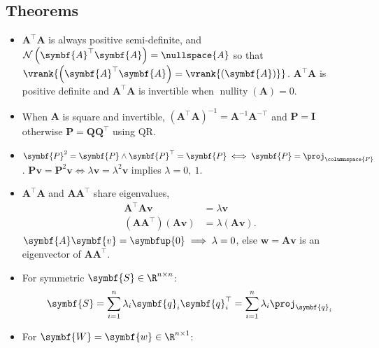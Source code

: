\documentclass{article}
\DeclareMathOperator*{\nullity}{nullity}
\begin{document}
\begin{multicols*}{3}
    \section{Theorems}
    \begin{itemize}
        \item \(\symbf{A}^\top \symbf{A}\) is always positive semi-definite,
              and \(\mathcal{N}\left( \symbf{A}^\top\symbf{A} \right) = \nullspace{A}\) so that
              \(\vrank{\left( \symbf{A}^\top \symbf{A} \right) = \vrank{\left( \symbf{A} \right)}}\).
              \(\symbf{A}^\top \symbf{A}\) is positive definite and
              \(\symbf{A}^\top \symbf{A}\) is invertible when \(\nullity{\left( \symbf{A} \right)} = 0\).
        \item When \(\symbf{A}\) is square and invertible, \(\left(
              \symbf{A}^\top \symbf{A} \right)^{-1} = \symbf{A}^{-1}
              \symbf{A}^{-\top}\) and \(\symbf{P} = \symbf{I}\)
              otherwise \(\symbf{P} = \symbf{Q} \symbf{Q}^\top\) using
              QR\@.
        \item \(\symbf{P}^2 = \symbf{P} \land \symbf{P}^\top = \symbf{P} \iff \symbf{P} = \proj_{\columnspace{P}}\).
              \(\symbf{P} \symbf{v} = \symbf{P}^2 \symbf{v} \iff \lambda \symbf{v} = \lambda^2 \symbf{v}\) implies \(\lambda = 0,\: 1\).
        \item \(\symbf{A}^\top \symbf{A}\) and \(\symbf{A} \symbf{A}^\top\) share eigenvalues,
              \begin{align*}
                  \symbf{A}^\top \symbf{A} \symbf{v}                                         & = \lambda \symbf{v}                           \\
                  \left( \symbf{A} \symbf{A}^\top \right) \left( \symbf{A} \symbf{v} \right) & = \lambda \left( \symbf{A} \symbf{v} \right).
              \end{align*}
              \(\symbf{A} \symbf{v} = \symbfup{0} \implies \lambda = 0\), else \(\symbf{w} = \symbf{A} \symbf{v}\) is an eigenvector of \(\symbf{A} \symbf{A}^\top\).
        \item For symmetric \(\symbf{S} \in \R^{n \times n}\):
              \begin{equation*}
                  \symbf{S} = \sum_{i = 1}^n \lambda_i \symbf{q}_i \symbf{q}_i^\top = \sum_{i = 1}^n \lambda_i \proj_{\symbf{q}_i}
              \end{equation*}
        \item For \(\symbf{W} = \symbf{w} \in \R^{n \times 1}\):

\end{itemize}
\end{multicols*}
\end{document}
